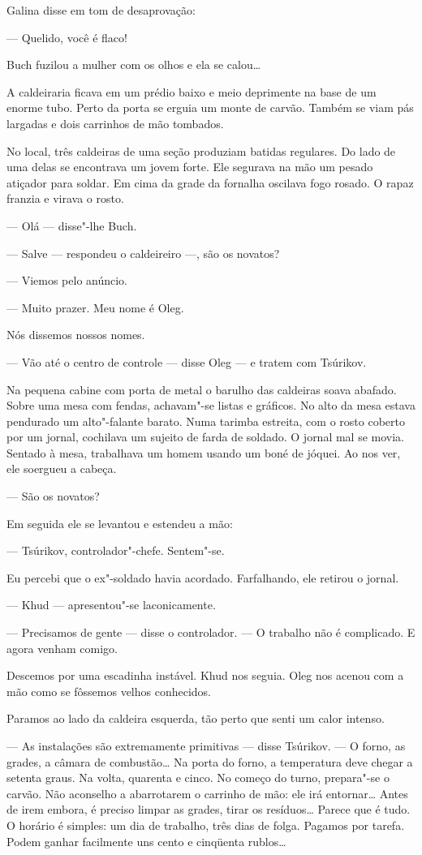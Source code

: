 Galina disse em tom de desaprovação:

--- Quelido, você é flaco!

Buch fuzilou a mulher com os olhos e ela se calou\ldots{}

A caldeiraria ficava em um prédio baixo e meio deprimente na base de um
enorme tubo. Perto da porta se erguia um monte de carvão. Também se viam
pás largadas e dois carrinhos de mão tombados.

No local, três caldeiras de uma seção produziam batidas regulares. Do
lado de uma delas se encontrava um jovem forte. Ele segurava na mão um
pesado atiçador para soldar. Em cima da grade da fornalha oscilava fogo
rosado. O rapaz franzia e virava o rosto.

--- Olá --- disse"-lhe Buch.

--- Salve --- respondeu o caldeireiro ---, são os novatos?

--- Viemos pelo anúncio.

--- Muito prazer. Meu nome é Oleg.

Nós dissemos nossos nomes.

--- Vão até o centro de controle --- disse Oleg --- e tratem com
Tsúrikov.

Na pequena cabine com porta de metal o barulho das caldeiras soava
abafado. Sobre uma mesa com fendas, achavam"-se listas e gráficos. No
alto da mesa estava pendurado um alto"-falante barato. Numa tarimba
estreita, com o rosto coberto por um jornal, cochilava um sujeito de
farda de soldado. O jornal mal se movia. Sentado à mesa, trabalhava um
homem usando um boné de jóquei. Ao nos ver, ele soergueu a cabeça.

--- São os novatos?

Em seguida ele se levantou e estendeu a mão:

--- Tsúrikov, controlador"-chefe. Sentem"-se.

Eu percebi que o ex"-soldado havia acordado. Farfalhando, ele retirou o
jornal.

--- Khud --- apresentou"-se laconicamente.

--- Precisamos de gente --- disse o controlador. --- O trabalho não é
complicado. E agora venham comigo.

Descemos por uma escadinha instável. Khud nos seguia. Oleg nos acenou
com a mão como se fôssemos velhos conhecidos.

Paramos ao lado da caldeira esquerda, tão perto que senti um calor
intenso.

--- As instalações são extremamente primitivas --- disse Tsúrikov. --- O
forno, as grades, a câmara de combustão\ldots{} Na porta do forno, a
temperatura deve chegar a setenta graus. Na volta, quarenta e cinco. No
começo do turno, prepara"-se o carvão. Não aconselho a abarrotarem o
carrinho de mão: ele irá entornar\ldots{} Antes de irem embora, é preciso
limpar as grades, tirar os resíduos\ldots{} Parece que é tudo. O horário é
simples: um dia de trabalho, três dias de folga. Pagamos por tarefa.
Podem ganhar facilmente uns cento e cinqüenta rublos\ldots{}

